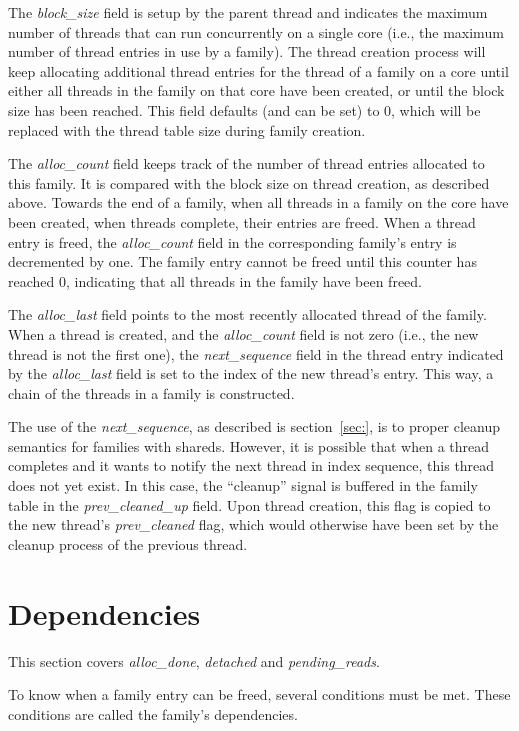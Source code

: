 The \emph{block\_size} field is setup by the parent thread and indicates the maximum number of threads that can run concurrently on a single core (i.e., the maximum number of thread entries in use by a family). The thread creation process will keep allocating additional thread entries for the thread of a family on a core until either all threads in the family on that core have been created, or until the block size has been reached. This field defaults (and can be set) to 0, which will be replaced with the thread table size during family creation.

The \emph{alloc\_count} field keeps track of the number of thread entries allocated to this family. It is compared with the block size on thread creation, as described above. Towards the end of a family, when all threads in a family on the core have been created, when threads complete, their entries are freed. When a thread entry is freed, the \emph{alloc\_count} field in the corresponding family's entry is decremented by one. The family entry cannot be freed until this counter has reached 0, indicating that all threads in the family have been freed.

The \emph{alloc\_last} field points to the most recently allocated thread of the family. When a thread is created, and the \emph{alloc\_count} field is not zero (i.e., the new thread is not the first one), the \emph{next\_sequence} field in the thread entry indicated by the \emph{alloc\_last} field is set to the index of the new thread's entry. This way, a chain of the threads in a family is constructed.

The use of the \emph{next\_sequence}, as described is section~\ref{sec:}, is to proper cleanup semantics for families with shareds. However, it is possible that when a thread completes and it wants to notify the next thread in index sequence, this thread does not yet exist. In this case, the ``cleanup'' signal is buffered in the family table in the \emph{prev\_cleaned\_up} field. Upon thread creation, this flag is copied to the new thread's \emph{prev\_cleaned} flag, which would otherwise have been set by the cleanup process of the previous thread.

\section{Dependencies}
This section covers \emph{alloc\_done}, \emph{detached} and \emph{pending\_reads}.

To know when a family entry can be freed, several conditions must be met. These conditions are called the family's dependencies.

